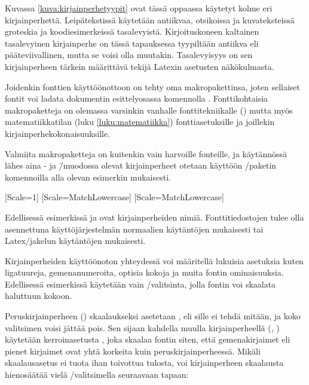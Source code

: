 Kuvassa \ref{kuva:kirjainperhetyypit} ovat tässä oppaassa käytetyt kolme
eri kirjainperhettä. Leipätekstissä käytetään antiikvaa, otsikoissa ja
kuvateksteissä groteskia ja koodi\-esi\-mer\-keis\-sä tasalevyistä.
Kirjoituskoneen kaltainen tasalevyinen kirjainperhe on tässä tapauksessa
tyypiltään antiikva eli pääteviivallinen, mutta se voisi olla muutakin.
Tasalevyisyys on sen kirjainperheen tärkein määrittävä tekijä Latexin
asetusten näkökulmasta.


Joidenkin fonttien käyttöönottoon on tehty oma makropakettinsa, joten
sellaiset fontit voi ladata dokumentin esittelyosassa komennolla
. Fonttikohtaisia makropaketteja on olemassa
varsinkin vanhalle fonttitekniikalle () mutta myös matematiikkatilan (luku \ref{luku:matematiikka})
fonttiasetuksille ja joillekin kir\-jain\-perhe\-koko\-nai\-suuk\-sille.

Valmiita makropaketteja on kuitenkin vain harvoille fonteille, ja
käytännössä lähes aina - ja 
\=/muodossa olevat kirjainperheet otetaan käyttöön
\-/paketin komennoilla alla olevan esimerkin
mukaisesti.

\begin{koodilohkosis}
  \setmainfont{TeX Gyre Termes}[Scale=1]
  \setsansfont{TeX Gyre Heros} [Scale=MatchLowercase]
  \setmonofont{TeX Gyre Cursor}[Scale=MatchLowercase]
\end{koodilohkosis}

Edellisessä esimerkissä  ja
 ovat kirjainperheiden nimiä. Fonttitiedostojen
tulee olla asennettuna käyttöjärjestelmän normaalien käytäntöjen
mukaisesti tai Latex\-/jakelun käytäntöjen mukaisesti.

Kirjainperheiden käyttöönoton yhteydessä voi määritellä lukuisia
asetuksia kuten ligatuureja, gemenanumeroita, optisia kokoja ja muita
fontin ominaisuuksia. Edellisessä esimerkissä käytetään vain
\-/valitsinta, jolla fontin voi skaalata haluttuun kokoon.

Peruskirjainperheen () skaalaukseksi
asetetaan , eli sille ei tehdä mitään, ja koko valitsimen
voisi jättää pois. Sen sijaan kahdella muulla kirjainperheellä
(, ) käytetään
ker\-roin\-ase\-tus\-ta , joka skaalaa fontin
siten, että gemenakirjaimet eli pienet kirjaimet ovat yhtä korkeita kuin
peruskirjainperheessä. Mikäli skaa\-laus\-ase\-tus
 ei tuota ihan toivottua tulosta, voi
kirjainperheen skaalausta hienosäätää vielä
\-/valitsimella seuraavaan tapaan:

